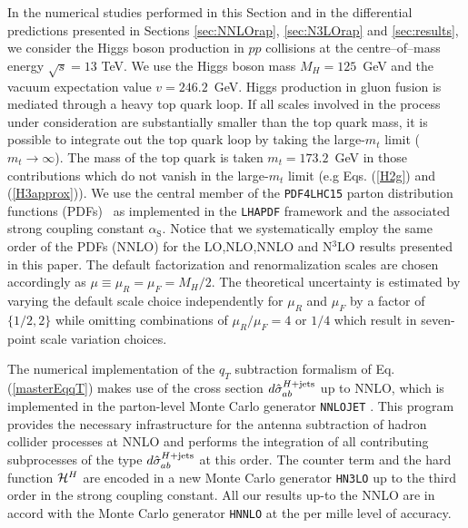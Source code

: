 \documentclass[12pt]{article}
\newcommand\as{\alpha_{\mathrm{S}}}
\def\qt{q_T}
\begin{document}
In the numerical studies performed in this Section and in the differential predictions presented in Sections \ref{sec:NNLOrap}, \ref{sec:N3LOrap} and \ref{sec:results}, we consider the Higgs boson production in $pp$ collisions at the centre--of--mass energy $\sqrt{s}=13$ TeV. We use the Higgs boson mass  $M_H= 125$~GeV and the vacuum expectation value  $v=246.2$~GeV. Higgs production in gluon fusion is mediated through a heavy top quark loop. If all scales involved in the process under consideration are substantially smaller than the top quark mass, it is possible to integrate out the top quark loop by taking the large-$m_t$ limit ($m_{t}\rightarrow \infty$). The mass of the top quark is taken $m_t = 173.2$~GeV in those contributions which do not vanish in the large-$m_t$ limit (e.g  Eqs. (\ref{H2g}) and  (\ref{H3approx})). We use the central member of the \texttt{PDF4LHC15} parton distribution functions (PDFs)~\cite{nnpdf} as implemented in the \texttt{LHAPDF} framework \cite{Buckley:2014ana} and the associated strong coupling constant $\as$. Notice that we systematically employ the same order of the PDFs (NNLO) for the LO,NLO,NNLO and N$^{3}$LO results presented in this paper. The default factorization and renormalization scales are chosen accordingly as $\mu \equiv \mu_R = \mu_F =  M_H / 2$. The theoretical uncertainty is estimated by varying the default scale choice independently for $\mu_R$ and $\mu_F$ by a factor of $\{1/2,2\}$ while omitting combinations of $\mu_R/\mu_F = 4$ or $1/4$ which result in seven-point scale variation choices. 

The numerical implementation of the $\qt$ subtraction formalism of Eq. (\ref{masterEqqT}) makes use of the cross section $d{\hat \sigma}_{ab}^{H+{\rm jets}}$ up to NNLO, which is implemented in the  parton-level Monte Carlo generator \texttt{NNLOJET} \cite{Chen:2016zka}. This program provides the necessary infrastructure for the antenna subtraction \cite{Antenna:method} of hadron collider processes at NNLO and performs the integration of all contributing subprocesses of the type  $d{\hat \sigma}_{ab}^{H+{\rm jets}}$ at this order. The counter term and the hard function ${\cal H}^H$ are encoded in a new Monte Carlo generator \texttt{HN3LO} up to the third order in the strong coupling constant. All our results up-to the NNLO are in accord with the Monte Carlo generator \texttt{HNNLO} \cite{Catani:2007vq} at the per mille level of accuracy.
\end{document}

